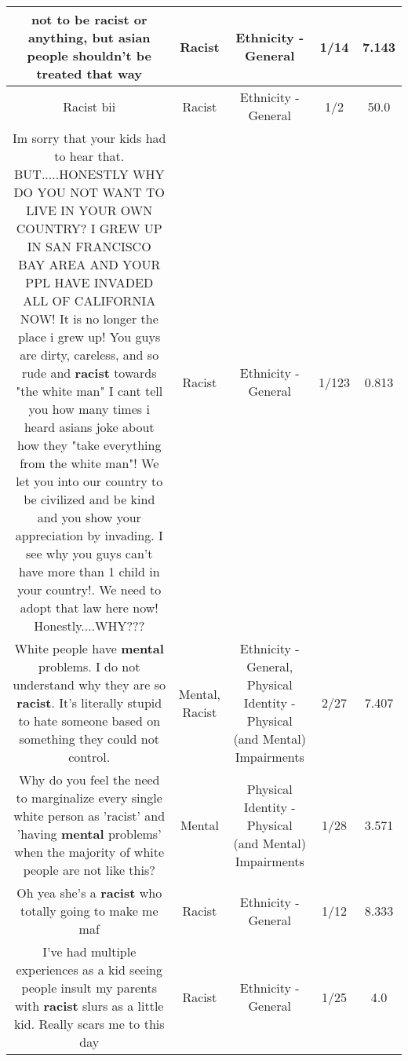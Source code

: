 \documentclass[11pt]{article}
\newlength\mylength
\begin{document}
\begin{center}
\begin{longtable}{|C{.65\mylength}|C{.30\mylength}|C{.12\mylength}|C{.12\mylength}|C{.12\mylength}|}
  \small not to be \textbf{racist} or anything, but asian people shouldn't be treated that way\normalsize   & Racist & Ethnicity - General & 1/14 & 7.143 \\  \hline
  \small Racist bii\normalsize   & Racist & Ethnicity - General & 1/2 & 50.0 \\  \hline
  \small Im sorry that your kids had to hear that. BUT.....HONESTLY WHY DO YOU NOT WANT TO LIVE IN YOUR OWN COUNTRY? I GREW UP IN SAN FRANCISCO BAY AREA AND YOUR PPL HAVE INVADED ALL OF CALIFORNIA NOW! It is no longer the place i grew up! You guys are dirty, careless, and so rude and \textbf{racist} towards "the white man" I cant tell you how many times i heard asians joke about how they "take everything from the white man"! We let you into our country to be civilized and be kind and you show your appreciation by invading. I see why you guys can't have more than 1 child in your country!. We need to adopt that law here now! Honestly....WHY???\normalsize   & Racist & Ethnicity - General & 1/123 & 0.813 \\  \hline
  \small White people have \textbf{mental} problems. I do not understand why they are so \textbf{racist}. It's literally stupid to hate someone based on something they could not control.\normalsize   & Mental, Racist & Ethnicity - General, Physical Identity - Physical (and Mental) Impairments & 2/27 & 7.407 \\  \hline
  \small Why do you feel the need to marginalize every single white person as 'racist' and 'having \textbf{mental} problems' when the majority of white people are not like this?\normalsize   & Mental & Physical Identity - Physical (and Mental) Impairments & 1/28 & 3.571 \\  \hline
  \small Oh yea she's a \textbf{racist} who totally going to make me maf\normalsize   & Racist & Ethnicity - General & 1/12 & 8.333 \\  \hline
  \small I've had multiple experiences as a kid seeing people insult my parents with \textbf{racist} slurs as a little kid. Really scars me to this day\normalsize   & Racist & Ethnicity - General & 1/25 & 4.0 \\  \hline

\end{longtable}
\end{center}
\end{document}

